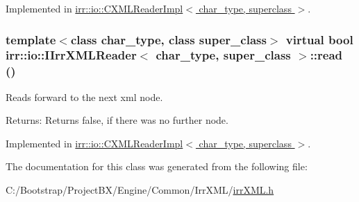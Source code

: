 Implemented in \hyperlink{classirr_1_1io_1_1_c_x_m_l_reader_impl_17154683d277084155fe6c5556cc0672}{irr::io::CXMLReaderImpl$<$ char\_\-type, superclass $>$}.\hypertarget{classirr_1_1io_1_1_i_irr_x_m_l_reader_157f458f7dabeeff173f72a0fb443a8e}{
\subsubsection[{read}]{\setlength{\rightskip}{0pt plus 5cm}template$<$class char\_\-type, class super\_\-class$>$ virtual bool {\bf irr::io::IIrrXMLReader}$<$ char\_\-type, super\_\-class $>$::read ()}}
\label{classirr_1_1io_1_1_i_irr_x_m_l_reader_157f458f7dabeeff173f72a0fb443a8e}


Reads forward to the next xml node. 

\begin{Desc}
\item[Returns:]Returns false, if there was no further node. \end{Desc}


Implemented in \hyperlink{classirr_1_1io_1_1_c_x_m_l_reader_impl_bc3c451a40c816ce74c846ebc2e71417}{irr::io::CXMLReaderImpl$<$ char\_\-type, superclass $>$}.

The documentation for this class was generated from the following file:\begin{CompactItemize}
\item 
C:/Bootstrap/ProjectBX/Engine/Common/IrrXML/\hyperlink{irr_x_m_l_8h}{irrXML.h}\end{CompactItemize}
